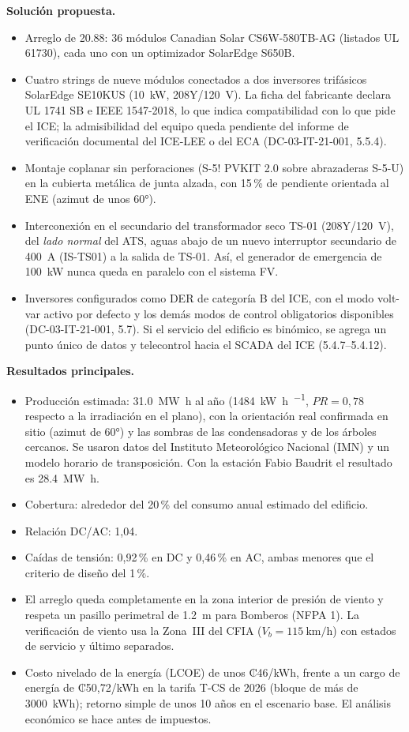 \documentclass[12pt]{article}
\begin{document}
\textbf{Solución propuesta.}
\begin{itemize}
\item Arreglo de \SI{20.88}{\kWp}: 36 módulos Canadian Solar CS6W-580TB-AG (listados UL 61730), cada uno con un optimizador SolarEdge S650B.
\item Cuatro strings de nueve módulos conectados a dos inversores trifásicos SolarEdge SE10KUS (\SI{10}{\kilo\watt}, 208Y/120~V). La ficha del fabricante declara UL 1741 SB e IEEE 1547-2018, lo que indica compatibilidad con lo que pide el ICE; la admisibilidad del equipo queda pendiente del informe de verificación documental del ICE-LEE o del ECA (DC-03-IT-21-001, 5.5.4).
\item Montaje coplanar sin perforaciones (S-5! PVKIT 2.0 sobre abrazaderas S-5-U) en la cubierta metálica de junta alzada, con 15\,\% de pendiente orientada al ENE (azimut de unos 60°).
\item Interconexión en el secundario del transformador seco TS-01 (208Y/120~V), del \emph{lado normal} del ATS, aguas abajo de un nuevo interruptor secundario de 400~A (IS-TS01) a la salida de TS-01. Así, el generador de emergencia de \SI{100}{\kilo\watt} nunca queda en paralelo con el sistema FV.
\item Inversores configurados como DER de categoría B del ICE, con el modo volt-var activo por defecto y los demás modos de control obligatorios disponibles (DC-03-IT-21-001, 5.7). Si el servicio del edificio es binómico, se agrega un punto único de datos y telecontrol hacia el SCADA del ICE (5.4.7--5.4.12).
\end{itemize}

\textbf{Resultados principales.}
\begin{itemize}
\item Producción estimada: \SI{31.0}{\mega\watt\hour} al año (\SI{1484}{\kilo\watt\hour\per\kWp}, $PR=0{,}78$ respecto a la irradiación en el plano), con la orientación real confirmada en sitio (azimut de 60°) y las sombras de las condensadoras y de los árboles cercanos. Se usaron datos del Instituto Meteorológico Nacional (IMN) y un modelo horario de transposición. Con la estación Fabio Baudrit el resultado es \SI{28.4}{\mega\watt\hour}.
\item Cobertura: alrededor del 20\,\% del consumo anual estimado del edificio.
\item Relación DC/AC: 1,04.
\item Caídas de tensión: 0,92\,\% en DC y 0,46\,\% en AC, ambas menores que el criterio de diseño del 1\,\%.
\item El arreglo queda completamente en la zona interior de presión de viento y respeta un pasillo perimetral de \SI{1.2}{\meter} para Bomberos (NFPA 1). La verificación de viento usa la Zona~III del CFIA ($V_b=\SI{115}{\kilo\meter\per\hour}$) con estados de servicio y último separados.
\item Costo nivelado de la energía (LCOE) de unos ₡46/kWh, frente a un cargo de energía de ₡50,72/kWh en la tarifa T-CS de 2026 (bloque de más de 3000~kWh); retorno simple de unos 10 años en el escenario base. El análisis económico se hace antes de impuestos.
\end{itemize}
\end{document}
